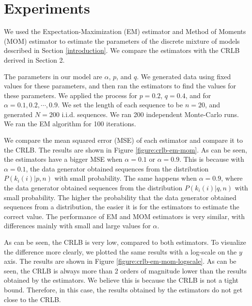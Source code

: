 \section{Experiments}

We used the Expectation-Maximization (EM) estimator and Method of Moments (MOM) estimator to estimate the parameters of the discrete mixture of models described in Section \ref{introduction}. We compare the estimators with the CRLB derived in Section 2.

The parameters in our model are $\alpha$, $p$, and $q$. We generated data using fixed values for these parameters, and then ran the estimators to find the values for these parameters. 
We applied the process for $p=0.2$, $q=0.4$, and for $\alpha=0.1, 0.2, \cdots, 0.9$. 
We set the length of each sequence to be $n=20$, and generated $N=200$ i.i.d. sequences.
We ran 200 independent Monte-Carlo runs.
We ran the EM algorithm for 100 iterations.

We compare the mean squared error (MSE) of each estimator and compare it to the CRLB.
The results are shown in Figure \ref{figure:crlb-em-mom}. 
As can be seen, the estimators have a bigger MSE when $\alpha=0.1$ or $\alpha=0.9$. 
This is because with $\alpha=0.1$, the data generator obtained sequences from the distribution $P(k_i(i)|p,n)$ with small probability.
The same happens when $\alpha=0.9$, where the data generator obtained sequences from the distribution $P(k_i(i)|q,n)$ with small probability.
The higher the probability that the data generator obtained sequences from a distribution, the easier it is for the estimators to estimate the correct value.
The performance of EM and MOM estimators is very similar, with differences mainly with small and large values for $\alpha$.

As can be seen, the CRLB is very low, compared to both estimators. 
To visualize the difference more clearly, we plotted the same results with a log-scale on the $y$ axis. 
The results are shown in Figure \ref{figure:crlb-em-mom-logscale}.
As can be seen, the CRLB is always more than 2 orders of magnitude lower than the results obtained by the estimators. 
We believe this is because the CRLB is not a tight bound. 
Therefore, in this case, the results obtained by the estimators do not get close to the CRLB.

